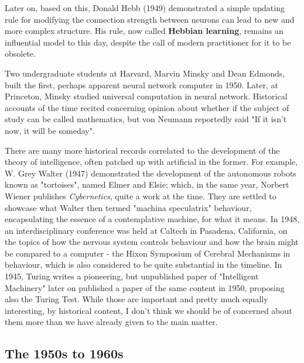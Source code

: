 Later on, based on this, Donald Hebb (1949) demonstrated a simple updating rule for modifying the connection strength between neurons can lead to new and more complex structure. His rule, now called \textbf{Hebbian learning}, remains an influential model to this day, despite the call of modern practitioner for it to be obsolete.  

Two undergraduate students at Harvard, Marvin Minsky and Dean Edmonds, built the first, perhaps apparent neural network computer in 1950. Later, at Princeton, Minsky studied universal computation in neural network. Historical accounts of the time recited concerning opinion about whether if the subject of study can be called mathematics, but von Neumann reportedly said "If it isn't now, it will be someday". 

There are many more historical records correlated to the development of the theory of intelligence, often patched up with artificial in the former. For example, W. Grey Walter (1947) demonstrated the development of the autonomous robots known as "tortoises", named Elmer and Elsie; which, in the same year, Norbert Wiener publishes \textit{Cybernetics}, quite a work at the time. They are settled to showcase what Walter then termed "machina speculatrix" behaviour, encapsulating the essence of a contemplative machine, for what it means. In 1948, an interdisciplinary conference was held at Caltech in Pasadena, California, on the topics of how the nervous system controls behaviour and how the brain might be compared to a computer - the Hixon Symposium of Cerebral Mechanisms in behaviour, which is also considered to be quite substantial in the timeline. In 1945, Turing writes a pioneering, but unpublished paper of "Intelligent Machinery" later on published a paper of the same content in 1950, proposing also the Turing Test. While those are important and pretty much equally interesting, by historical content, I don't think we should be of concerned about them more than we have already given to the main matter. 
\subsection{The 1950s to 1960s}

